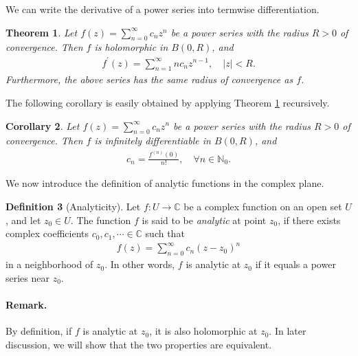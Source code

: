 \documentclass{article}
\numberwithin{equation}{section}
\newcommand{\bbC}{\mathbb{C}}
\newcommand{\bbN}{\mathbb{N}}
\theoremstyle{plain}
\newtheorem{theorem}{Theorem}[section]
\newtheorem{corollary}[theorem]{Corollary}
\theoremstyle{definition}
\newtheorem{definition}[theorem]{Definition}
\begin{document}
We can write the derivative of a power series into termwise differentiation.
\begin{theorem}\label{powerholo}
Let $f(z)=\sum_{n=0}^\infty c_nz^n$ be a power series with the radius $R>0$ of convergence. Then $f$ is holomorphic in $B(0,R)$, and
\begin{align*}
	f^\prime(z)=\sum_{n=1}^\infty nc_nz^{n-1},\quad\vert z\vert<R.
\end{align*}
Furthermore, the above series has the same radius of convergence as $f$.
\end{theorem}

The following corollary is easily obtained by applying Theorem \ref{powerholo} recursively.
\begin{corollary}
Let $f(z)=\sum_{n=0}^\infty c_nz^n$ be a power series with the radius $R>0$ of convergence. Then $f$ is infinitely differentiable in $B(0,R)$, and 
\begin{align*}
	c_n=\frac{f^{(n)}(0)}{n!},\quad\forall n\in\bbN_0.
\end{align*}
\end{corollary}

We now introduce the definition of analytic functions in the complex plane.
\begin{definition}[Analyticity]
Let $f:U\to\bbC$ be a complex function on an open set $U$, and let $z_0\in U$. The function $f$ is said to be \textit{analytic} at point $z_0$, if there exists complex coefficients $c_0,c_1,\cdots\in\bbC$ such that
\begin{align*}
	f(z)=\sum_{n=0}^\infty c_n(z-z_0)^n
\end{align*}
in a neighborhood of $z_0$. In other words, $f$ is analytic at $z_0$ if it equals a power series near $z_0$.
\end{definition}
\paragraph{Remark.} By definition, if $f$ is analytic at $z_0$, it is also holomorphic at $z_0$. In later discussion, we will show that the two properties are equivalent.
\end{document}
